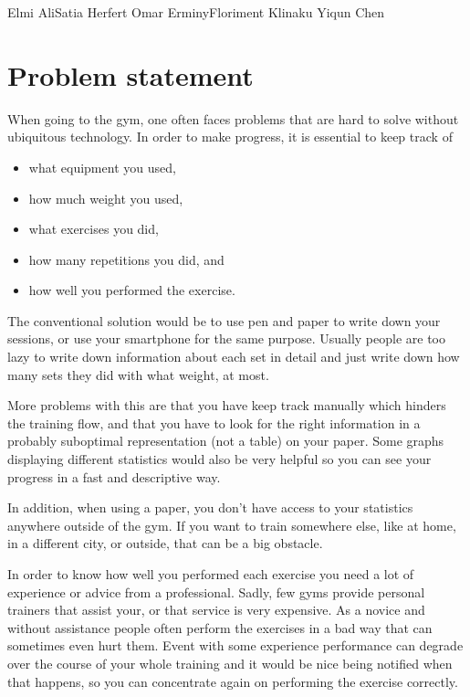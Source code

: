\documentclass{tk3-team}
\begin{document}
%
                {Elmi Ali}{Satia Herfert}%
                {Omar Erminy}{Floriment Klinaku}%
                {Yiqun Chen}%

\section{Problem statement}


When going to the gym, one often faces problems that are hard to solve without ubiquitous technology. In order to make progress, it is essential to keep track of
\begin{itemize}
	\item what equipment you used,
	\item how much weight you used,
	\item what exercises you did,
	\item how many repetitions you did, and
	\item how well you performed the exercise.
\end{itemize}

The conventional solution would be to use pen and paper to write down your sessions, or use your smartphone for the same purpose. Usually people are too lazy to write down information about each set in detail and just write down how many sets they did with what weight, at most.

More problems with this are that you have keep track manually which hinders the training flow, and that you have to look for the right information in a probably suboptimal representation (not a table) on your paper. Some graphs displaying different statistics would also be very helpful so you can see your progress in a fast and descriptive way.

In addition, when using a paper, you don't have access to your statistics anywhere outside of the gym. If you want to train somewhere else, like at home, in a different city, or outside, that can be a big obstacle.

In order to know how well you performed each exercise you need a lot of experience or advice from a professional. Sadly, few gyms provide personal trainers that assist your, or that service is very expensive. As a novice and without assistance people often perform the exercises in a bad way that can sometimes even hurt them. Event with some experience performance can degrade over the course of your whole training and it would be nice being notified when that happens, so you can concentrate again on performing the exercise correctly.
\end{document}

